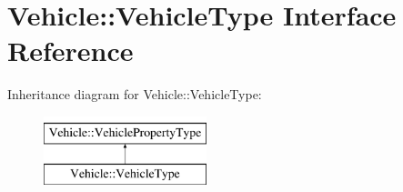 \hypertarget{interfaceVehicle_1_1VehicleType}{\section{Vehicle\-:\-:Vehicle\-Type Interface Reference}
\label{interfaceVehicle_1_1VehicleType}
}
Inheritance diagram for Vehicle\-:\-:Vehicle\-Type\-:\begin{figure}[H]
\begin{center}
\leavevmode
\includegraphics[height=2.000000cm]{interfaceVehicle_1_1VehicleType}
\end{center}
\end{figure}
